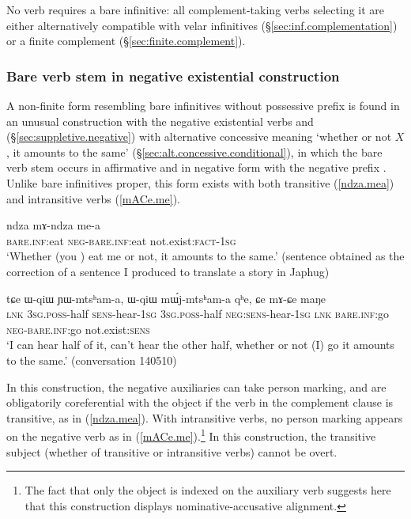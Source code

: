 No verb requires a bare infinitive: all complement-taking verbs selecting it are either alternatively compatible with velar infinitives (§\ref{sec:inf.complementation}) or a finite complement (§\ref{sec:finite.complement}).

\subsubsection{Bare verb stem in negative existential construction} \label{sec:bare.inf.negative} 
A non-finite form resembling bare infinitives without possessive prefix is found in an unusual construction with the negative existential verbs   and (§\ref{sec:suppletive.negative}) with alternative concessive meaning `whether or not $X$, it amounts to the same' (§\ref{sec:alt.concessive.conditional}), in which the bare verb stem occurs in affirmative and in negative form with the negative prefix . Unlike bare infinitives proper, this form exists with both transitive (\ref{ndza.mea}) and intransitive verbs (\ref{mACe.me}).

\begin{exe}
\ex \label{ndza.mea}
\gll ndza mɤ-ndza me-a \\
\textsc{bare}.\textsc{inf}:eat \textsc{neg}-\textsc{bare}.\textsc{inf}:eat not.exist:\textsc{fact}-\textsc{1sg} \\
\glt `Whether (you ) eat me or not, it amounts to the same.' (sentence obtained as the correction of a sentence I produced to translate a story in Japhug)
\end{exe}

\begin{exe}
\ex \label{mACe.me}
\gll tɕe ɯ-qiɯ ɲɯ-mtsʰam-a, ɯ-qiɯ mɯ́j-mtsʰam-a qʰe, ɕe mɤ-ɕe maŋe   \\
\textsc{lnk} \textsc{3sg}.\textsc{poss}-half \textsc{sens}-hear-\textsc{1sg} \textsc{3sg}.\textsc{poss}-half \textsc{neg}:\textsc{sens}-hear-\textsc{1sg} \textsc{lnk} \textsc{bare}.\textsc{inf}:go \textsc{neg}-\textsc{bare}.\textsc{inf}:go not.exist:\textsc{sens} \\
\glt `I can hear half of it, can't hear the other half, whether or not (I) go it amounts to the same.' (conversation 140510)
\end{exe}

In this construction, the negative auxiliaries can take person marking, and are obligatorily coreferential with the object if the verb in the complement clause is transitive, as in (\ref{ndza.mea}). With intransitive verbs, no person marking appears on the negative verb as in (\ref{mACe.me}).\footnote{The fact that only the object is indexed on the auxiliary verb suggests here that this construction displays nominative-accusative alignment.  }
In this construction, the transitive subject (whether of transitive or intransitive verbs) cannot be overt.

